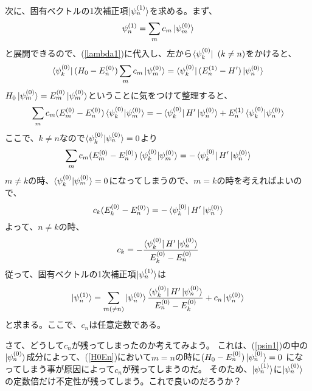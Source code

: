 次に、固有ベクトルの1次補正項$\ket{\psi_n^{(1)}}$を求める。まず、
\begin{equation}
	\label{psin1}
	\psi_n^{(1)} = \sum_m c_m \ket{\psi_m^{(0)}}
\end{equation}
と展開できるので、(\ref{lambda1})に代入し、左から$\bra{\psi_k^{(0)}}~(k \neq n)$をかけると、
\begin{equation}
	\label{H0En}
	\bra{\psi_k^{(0)}}(H_0 - E_n^{(0)}) \sum_m c_m \ket{\psi_m^{(0)}} = \bra{\psi_k^{(0)}}(E_n^{(1)} - H')\ket{\psi_n^{(0)}}
\end{equation}
$H_0\ket{\psi_m^{(0)}} = E_m^{(0)}\ket{\psi_m^{(0)}}$ということに気をつけて整理すると、
\begin{equation}
	\sum_m c_m (E_m^{(0)} - E_n^{(0)}) \braket{\psi_k^{(0)}|\psi_m^{(0)}} = - \bra{\psi_k^{(0)}} H' \ket{\psi_n^{(0)}} +  E_n^{(1)} \braket{\psi_k^{(0)}|\psi_n^{(0)}}
\end{equation}
ここで、$k \neq n$なので$\braket{\psi_k^{(0)}|\psi_n^{(0)}} = 0$より
\begin{equation}
	\sum_m c_m (E_m^{(0)} - E_n^{(0)}) \braket{\psi_k^{(0)}|\psi_m^{(0)}} = - \bra{\psi_k^{(0)}} H' \ket{\psi_n^{(0)}}
\end{equation}
$m \neq k$の時、$\braket{\psi_k^{(0)}|\psi_m^{(0)}} = 0$になってしまうので、$m = k$の時を考えればよいので、
\begin{equation}
	c_k (E_k^{(0)} - E_n^{(0)}) = - \bra{\psi_k^{(0)}} H' \ket{\psi_n^{(0)}}
\end{equation}
よって、$n \neq k$の時、
\begin{equation}
	c_k = - \dfrac{\bra{\psi_k^{(0)}} H' \ket{\psi_n^{(0)}}}{E_k^{(0)} - E_n^{(0)}}
\end{equation}
従って、固有ベクトルの1次補正項$\ket{\psi_n^{(1)}}$は
\begin{equation}
	\ket{\psi_n^{(1)}} = \sum_{m(\neq n)} \ket{\psi_n^{(0)}} \dfrac{\bra{\psi_k^{(0)}} H' \ket{\psi_n^{(0)}}}{E_n^{(0)} - E_k^{(0)}} + c_n\ket{\psi_n^{(0)}}
\end{equation}
と求まる。ここで、$c_n$は任意定数である。

さて、どうして$c_n$が残ってしまったのか考えてみよう。
これは、(\ref{psin1})の中の$\ket{\psi_n^{(0)}}$成分によって、(\ref{H0En})において$m = n$の時に$(H_0 - E_n^{(0)})\ket{\psi_n^{(0)}} = 0$
になってしまう事が原因によって$c_n$が残ってしまうのだ。
そのため、$\ket{\psi_n^{(1)}}$に$\ket{\psi_n^{(0)}}$の定数倍だけ不定性が残ってしまう。これで良いのだろうか？


